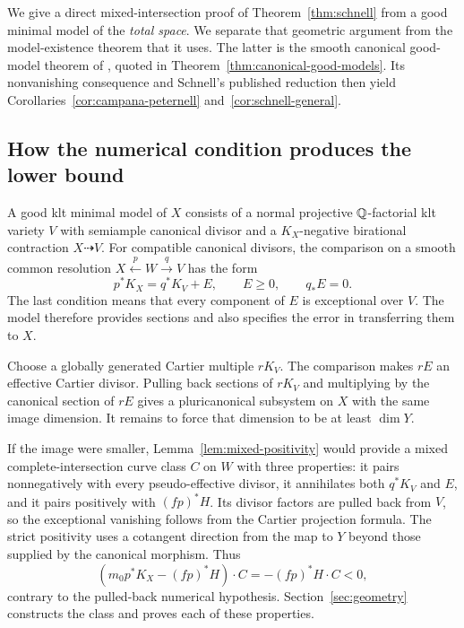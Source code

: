 We give a direct mixed-intersection proof of
Theorem~\ref{thm:schnell} from a good minimal model of the
\emph{total space}. We separate that geometric argument from the
model-existence theorem that it uses. The latter is the smooth
canonical good-model theorem of
\cite[Corollary~11.2]{LogAbundance2026}, quoted in
Theorem~\ref{thm:canonical-good-models}. Its nonvanishing consequence
and Schnell's published reduction then yield
Corollaries~\ref{cor:campana-peternell} and~\ref{cor:schnell-general}.

\subsection{How the numerical condition produces the lower bound}

A good klt minimal model of $X$ consists of a normal projective
$\mathbb Q$-factorial klt variety $V$ with semiample canonical divisor and a
$K_X$-negative birational contraction $X\dashrightarrow V$.
For compatible canonical divisors, the comparison on a smooth common
resolution $X\xleftarrow{p}W\xrightarrow{q}V$ has the form
\begin{equation}\label{eq:intro-comparison}
 p^*K_X=q^*K_V+E,\qquad E\geq0,\qquad q_*E=0.
\end{equation}
The last condition means that every component of $E$ is exceptional
over $V$. The model therefore provides sections and also specifies
the error in transferring them to $X$.

Choose a globally generated Cartier multiple $rK_V$. The comparison
makes $rE$ an effective Cartier divisor. Pulling back sections of
$rK_V$ and multiplying by the canonical section of $rE$ gives a
pluricanonical subsystem on $X$ with the same image dimension.
It remains to force that dimension to be at least $\dim Y$.

If the image were smaller, Lemma~\ref{lem:mixed-positivity} would
provide a mixed complete-intersection curve class $C$ on $W$ with
three properties: it pairs nonnegatively with every pseudo-effective
divisor, it annihilates both $q^*K_V$ and $E$, and it pairs positively
with $(fp)^*H$. Its divisor factors are pulled back from $V$, so
the exceptional vanishing follows from the Cartier projection formula.
The strict positivity uses a cotangent direction from the map to $Y$
beyond those supplied by the canonical morphism. Thus
\[
 (m_0p^*K_X-(fp)^*H)\cdot C=-(fp)^*H\cdot C<0,
\]
contrary to the pulled-back numerical hypothesis. Section~\ref{sec:geometry}
constructs the class and proves each of these properties.

